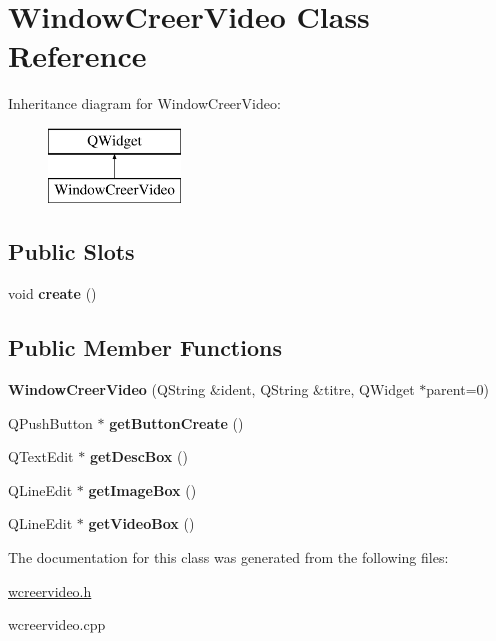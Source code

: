\hypertarget{class_window_creer_video}{}\section{Window\+Creer\+Video Class Reference}
\label{class_window_creer_video}
Inheritance diagram for Window\+Creer\+Video\+:\begin{figure}[H]
\begin{center}
\leavevmode
\includegraphics[height=2.000000cm]{class_window_creer_video}
\end{center}
\end{figure}
\subsection*{Public Slots}
\begin{DoxyCompactItemize}
\item 
\mbox{\label{class_window_creer_video_ad3e1e8f5e59e2001561e6643d674c351}} 
void {\bfseries create} ()
\end{DoxyCompactItemize}
\subsection*{Public Member Functions}
\begin{DoxyCompactItemize}
\item 
\mbox{\label{class_window_creer_video_a0e9565a3ecc54a92ed7f713a7994a08d}} 
{\bfseries Window\+Creer\+Video} (Q\+String \&ident, Q\+String \&titre, Q\+Widget $\ast$parent=0)
\item 
\mbox{\label{class_window_creer_video_a60780660a373eda8305b81636456aaaa}} 
Q\+Push\+Button $\ast$ {\bfseries get\+Button\+Create} ()
\item 
\mbox{\label{class_window_creer_video_a0ee2fcb0f619df9f239c3f244df1eb99}} 
Q\+Text\+Edit $\ast$ {\bfseries get\+Desc\+Box} ()
\item 
\mbox{\label{class_window_creer_video_a904f6f5104235bc1d710d8e9eacde6c8}} 
Q\+Line\+Edit $\ast$ {\bfseries get\+Image\+Box} ()
\item 
\mbox{\label{class_window_creer_video_a23944954785c8e4187aa92429fd343ce}} 
Q\+Line\+Edit $\ast$ {\bfseries get\+Video\+Box} ()
\end{DoxyCompactItemize}


The documentation for this class was generated from the following files\+:\begin{DoxyCompactItemize}
\item 
\hyperlink{wcreervideo_8h}{wcreervideo.\+h}\item 
wcreervideo.\+cpp\end{DoxyCompactItemize}
